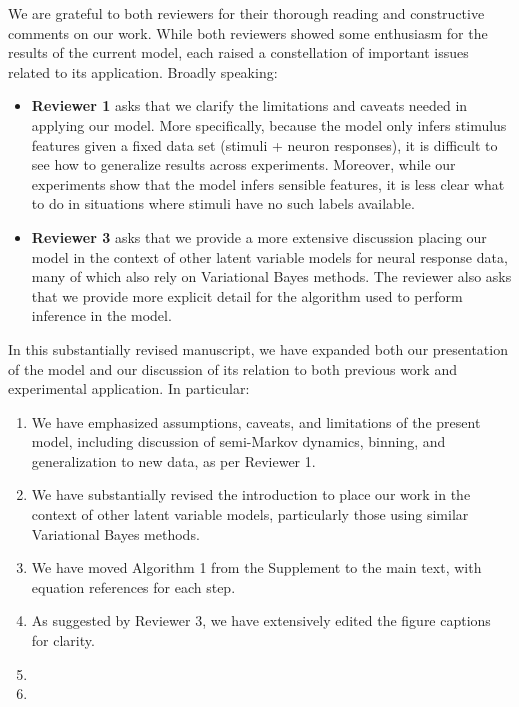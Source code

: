 \documentclass[12pt,a4paper]{article}
\newcommand{\edit}[1]{\textcolor{edit}{#1}}
\begin{document}
\edit{We are grateful to both reviewers for their thorough reading and constructive comments on our work. While both reviewers showed some enthusiasm for the results of the current model, each raised a constellation of important issues related to its application. Broadly speaking:
\begin{itemize}
    \item {\bf Reviewer 1} asks that we clarify the limitations and caveats needed in applying our model. More specifically, because the model only infers stimulus features given a fixed data set (stimuli + neuron responses), it is difficult to see how to generalize results across experiments. Moreover, while our experiments show that the model infers sensible features, it is less clear what to do in situations where stimuli have no such labels available.
    \item {\bf Reviewer 3} asks that we provide a more extensive discussion placing our model in the context of other latent variable models for neural response data, many of which also rely on Variational Bayes methods. The reviewer also asks that we provide more explicit detail for the algorithm used to perform inference in the model.
\end{itemize}
}

\edit{In this substantially revised manuscript, we have expanded both our presentation of the model and our discussion of its relation to both previous work and experimental application. In particular:
\begin{enumerate}
    \item We have emphasized assumptions, caveats, and limitations of the present model, including discussion of semi-Markov dynamics, binning, and generalization to new data, as per Reviewer 1.
    \item We have substantially revised the introduction to place our work in the context of other latent variable models, particularly those using similar Variational Bayes methods.
    \item We have moved Algorithm 1 from the Supplement to the main text, with equation references for each step.
    \item As suggested by Reviewer 3, we have extensively edited the figure captions for clarity.
    \item \color{red}{goodness of fit for firing rates?}
    \item \color{red}{binning simulation?}
\end{enumerate}
}
\end{document}
